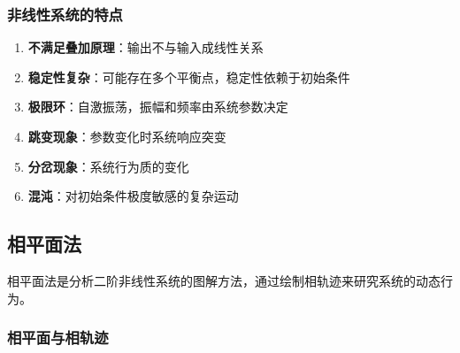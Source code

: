 \subsubsection{非线性系统的特点}

\begin{enumerate}
    \item \textbf{不满足叠加原理}：输出不与输入成线性关系
    \item \textbf{稳定性复杂}：可能存在多个平衡点，稳定性依赖于初始条件
    \item \textbf{极限环}：自激振荡，振幅和频率由系统参数决定
    \item \textbf{跳变现象}：参数变化时系统响应突变
    \item \textbf{分岔现象}：系统行为质的变化
    \item \textbf{混沌}：对初始条件极度敏感的复杂运动
\end{enumerate}

\subsection{相平面法}

相平面法是分析二阶非线性系统的图解方法，通过绘制相轨迹来研究系统的动态行为。

\subsubsection{相平面与相轨迹}

